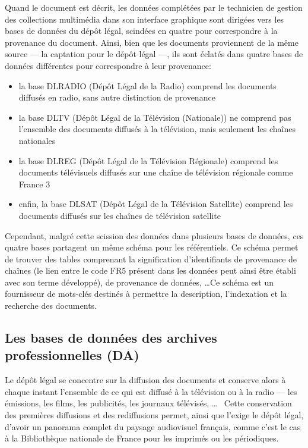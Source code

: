 Quand le document est décrit, les données complétées par le technicien de gestion des collections multimédia dans son interface graphique sont dirigées vers les bases de données du dépôt légal, scindées en quatre pour correspondre à la provenance du document. Ainsi, bien que les documents proviennent de la même source --- la captation pour le dépôt légal ---, ils sont éclatés dans quatre bases de données différentes pour correspondre à leur provenance:
\begin{itemize}
	\item la base DLRADIO (Dépôt Légal de la Radio) comprend les documents diffusés en radio, sans autre distinction de provenance
	\item la base DLTV (Dépôt Légal de la Télévision (Nationale)) ne comprend pas l'ensemble des documents diffusés à la télévision, mais seulement les chaînes nationales
	\item la base DLREG (Dépôt Légal de la Télévision Régionale) comprend les documents télévisuels diffusés sur une chaîne de télévision régionale comme France 3
	\item enfin, la base DLSAT (Dépôt Légal de la Télévision Satellite) comprend les documents diffusés sur les chaînes de télévision satellite
\end{itemize}
\bigskip

Cependant, malgré cette scission des données dans plusieurs bases de données, ces quatre bases partagent un même schéma pour les référentiels. Ce schéma permet de trouver des tables comprenant la signification d'identifiants de provenance de chaînes (le lien entre le code \og FR5\fg{} présent dans les données peut ainsi être établi avec son terme développé), de provenance de données, \dots Ce schéma est un fournisseur de mots-clés destinés à permettre la description, l'indexation et la recherche des documents.

\subsection{\label{I-B-2-b}Les bases de données des archives professionnelles (DA)}

Le dépôt légal se concentre sur la diffusion des documents et conserve alors à chaque instant l'ensemble de ce qui est diffusé à la télévision ou à la radio --- les émissions, les films, les publicités, les journaux télévisés, \dots~ Cette conservation des premières diffusions et des rediffusions permet, ainsi que l'exige le dépôt légal, d'avoir un panorama complet du paysage audiovisuel français, comme c'est le cas à la Bibliothèque nationale de France pour les imprimés ou les périodiques.\\

